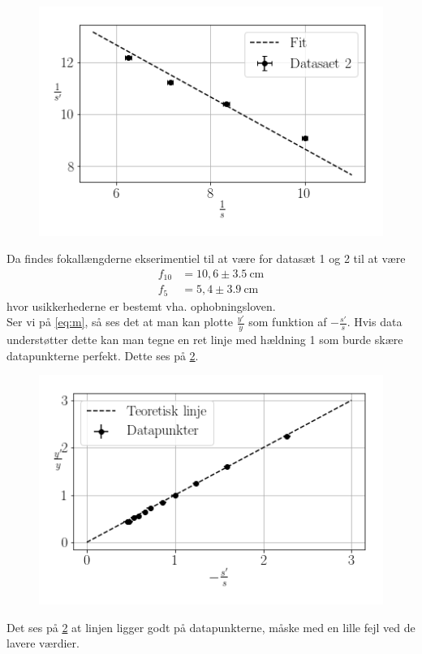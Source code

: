 \begin{figure}[H]
    \includegraphics[width=\linewidth]{2.png}
    \caption{}
    \label{fig:2}
\end{figure}

Da findes fokallængderne ekserimentiel til at være for datasæt 1 og 2 til at være
\begin{align}
    \nonumber f_{10} &=  10,6 \pm \SI{3,5}{\centi\meter} \\
    \nonumber f_{5} &= 5,4 \pm \SI{3,9}{\centi\meter}
\end{align}
hvor usikkerhederne er bestemt vha. ophobningsloven.
\\ Ser vi på \cref{eq:m}, så ses det at man kan plotte $\frac{y'}{y}$ som funktion af $-\frac{s'}{s}$. Hvis data understøtter dette kan man tegne en ret linje med hældning 1 som burde skære datapunkterne perfekt. Dette ses på \cref{fig:3}.
\begin{figure}[H]
    \includegraphics[width=\linewidth]{3.png}
    \caption{}
    \label{fig:3}
\end{figure}
Det ses på \cref{fig:3} at linjen ligger godt på datapunkterne, måske med en lille fejl ved de lavere værdier.


